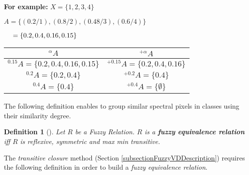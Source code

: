 \documentclass[11pt, oneside]{Thesis} %
\newtheorem{defi}{Definition}
\begin{document}
\textbf{For example:}
$X = \lbrace 1, 2, 3, 4 \rbrace$

$A = \lbrace (0.2/1), (0.8/2), (0.48/3), (0.6/4) \rbrace$

$\hspace{4.5mm} = \lbrace 0.2, 0.4, 0.16, 0.15 \rbrace$

\begin{table}[ht]
\begin{center}
\begin{tabular}{|c|c|}
\hline
$^\alpha A$ & $^{+\alpha} A$ \\
\hline \hline
$^{0.15} A = \lbrace 0.2, 0.4, 0.16, 0.15 \rbrace$ & 
$^{+0.15} A = \lbrace 0.2, 0.4, 0.16 \rbrace$ \\ \hline
$^{0.2} A = \lbrace 0.2, 0.4 \rbrace$ & 
$^{+0.2} A = \lbrace 0.4 \rbrace$ \\ \hline
$^{0.4} A = \lbrace 0.4 \rbrace$ & 
$^{+0.4} A = \lbrace \emptyset \rbrace$ \\ \hline
\end{tabular}
\end{center}
\end{table}


The following definition enables to group similar spectral pixels in classes 
using their similarity degree. \\

\begin{defi}[\cite{Klir}]
  \label{DefFuzzyFLEquivalenceRelation}
  Let $R$ be a Fuzzy Relation. $R$ is a \textbf{fuzzy equivalence relation} 
  iff $R$ is \textit{reflexive}, \textit{symmetric} and 
  \textit{max min transitive}.\\
\end{defi}

The \emph{transitive closure} method (Section \ref{subsectionFuzzyVDDescription}) 
requires the following definition in order to build a \emph{fuzzy equivalence relation}. \\
\end{document}
